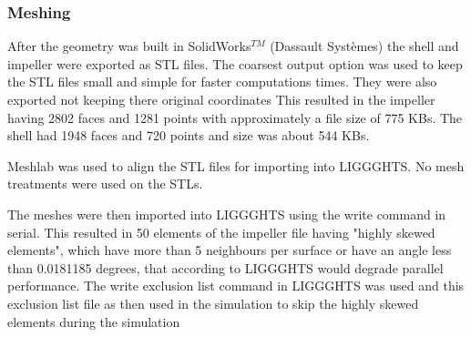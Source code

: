 \documentclass[preprint,11pt,authoryear]{elsarticle}
\begin{document}
\subsubsection{Meshing}
\par After the geometry was built in SolidWorks$^{TM}$ (Dassault Syst\`{e}mes) the shell and impeller 
were exported as STL files. The coarsest output option was used to keep the STL files small and 
simple for faster computations times. They were also exported not keeping there original coordinates  
This resulted in the impeller having 2802 faces and 1281 points with approximately a file size of 775 
KBs. The shell had 1948 faces and 720 points and size was about 544 KBs.  
\par Meshlab was used to align the STL files for importing into LIGGGHTS. No mesh treatments were 
used on the STLs. 
\par The meshes were then imported into LIGGGHTS using the write command in serial. This resulted 
in 50 elements of the impeller file having "highly skewed elements", which have more than 5 
neighbours per surface or have an angle less than 0.0181185 degrees, that according to LIGGGHTS 
would degrade parallel performance. The write exclusion list command in LIGGGHTS was used and 
this exclusion list file as then used in the simulation to skip the highly skewed elements during the 
simulation 
\end{document}
